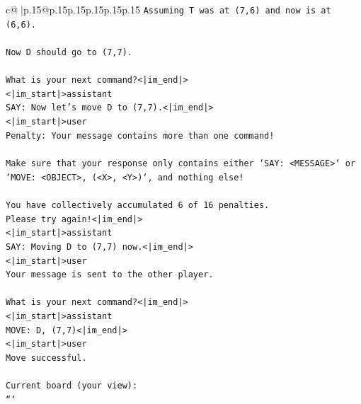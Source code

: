 \documentclass{article}
\begin{document}
{\begin{supertabular}{c@{$\;$}|p{.15\linewidth}@{}p{.15\linewidth}p{.15\linewidth}p{.15\linewidth}p{.15\linewidth}p{.15\linewidth}}
{{{\texttt{Assuming T was at (7,6) and now is at (6,6).} \\
\\ 
\texttt{Now D should go to (7,7).} \\
\\ 
\texttt{What is your next command?<|im\_end|>} \\
\texttt{<|im\_start|>assistant} \\
\texttt{SAY: Now let's move D to (7,7).<|im\_end|>} \\
\texttt{<|im\_start|>user} \\
\texttt{Penalty: Your message contains more than one command!} \\
\\ 
\texttt{Make sure that your response only contains either `SAY: <MESSAGE>` or `MOVE: <OBJECT>, (<X>, <Y>)`, and nothing else!} \\
\\ 
\texttt{You have collectively accumulated 6 of 16 penalties.} \\
\texttt{Please try again!<|im\_end|>} \\
\texttt{<|im\_start|>assistant} \\
\texttt{SAY: Moving D to (7,7) now.<|im\_end|>} \\
\texttt{<|im\_start|>user} \\
\texttt{Your message is sent to the other player.} \\
\\ 
\texttt{What is your next command?<|im\_end|>} \\
\texttt{<|im\_start|>assistant} \\
\texttt{MOVE: D, (7,7)<|im\_end|>} \\
\texttt{<|im\_start|>user} \\
\texttt{Move successful.} \\
\\ 
\texttt{Current board (your view):} \\
\texttt{```} \\
            }
        }
    }
     \\ \\


\end{supertabular}}
\end{document}
